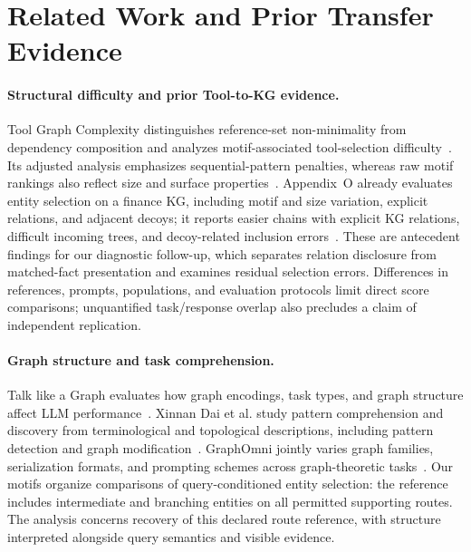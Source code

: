 \section{Related Work and Prior Transfer Evidence}
\label{sec:related}

\paragraph{Structural difficulty and prior Tool-to-KG evidence.}
Tool Graph Complexity distinguishes reference-set non-minimality from dependency composition and analyzes motif-associated tool-selection difficulty~\cite{anonymousToolGraph}. Its adjusted analysis emphasizes sequential-pattern penalties, whereas raw motif rankings also reflect size and surface properties~\cite{anonymousToolGraph}. Appendix~O already evaluates entity selection on a finance KG, including motif and size variation, explicit relations, and adjacent decoys; it reports easier chains with explicit KG relations, difficult incoming trees, and decoy-related inclusion errors~\cite{anonymousToolGraph}. These are antecedent findings for our diagnostic follow-up, which separates relation disclosure from matched-fact presentation and examines residual selection errors. Differences in references, prompts, populations, and evaluation protocols limit direct score comparisons; unquantified task/response overlap also precludes a claim of independent replication.

\paragraph{Graph structure and task comprehension.}
Talk like a Graph evaluates how graph encodings, task types, and graph structure affect LLM performance~\cite{fatemi2024talklikegraph}. Xinnan Dai et al. study pattern comprehension and discovery from terminological and topological descriptions, including pattern detection and graph modification~\cite{dai2025graphpatterns}. GraphOmni jointly varies graph families, serialization formats, and prompting schemes across graph-theoretic tasks~\cite{xu2026graphomni}. Our motifs organize comparisons of query-conditioned entity selection: the reference includes intermediate and branching entities on all permitted supporting routes. The analysis concerns recovery of this declared route reference, with structure interpreted alongside query semantics and visible evidence.

